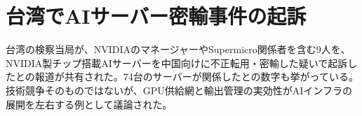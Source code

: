 \section{台湾でAIサーバー密輸事件の起訴}
台湾の検察当局が、NVIDIAのマネージャーやSupermicro関係者を含む9人を、NVIDIA製チップ搭載AIサーバーを中国向けに不正転用・密輸した疑いで起訴したとの報道が共有された。74台のサーバーが関係したとの数字も挙がっている。技術競争そのものではないが、GPU供給網と輸出管理の実効性がAIインフラの展開を左右する例として議論された。
